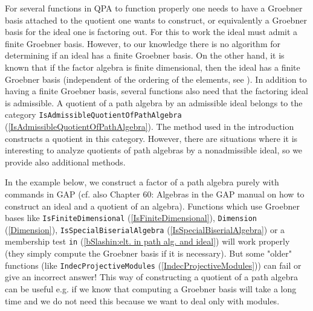 \documentclass[a4paper,11pt]{report}
\begin{document}
{{ For several functions in \textsf{QPA} to function properly one needs to have a Groebner basis attached to the
quotient one wants to construct, or equivalently a Groebner basis for the
ideal one is factoring out. For this to work the ideal must admit a finite
Groebner basis. However, to our knowledge there is no algorithm for
determining if an ideal has a finite Groebner basis. On the other hand, it is
known that if the factor algebra is finite dimensional, then the ideal has a
finite Groebner basis (independent of the ordering of the elements, see \cite{Green} ). In addition to having a finite Groebner basis, several functions also need
that the factoring ideal is admissible. A quotient of a path algebra by an
admissible ideal belongs to the category \texttt{IsAdmissibleQuotientOfPathAlgebra} (\ref{IsAdmissibleQuotientOfPathAlgebra}). The method used in the introduction constructs a quotient in this category.
However, there are situations where it is interesting to analyze quotients of
path algebras by a non\texttt{}admissible ideal, so we provide also
additional methods.

 In the example below, we construct a factor of a path algebra purely with
commands in \textsf{GAP} (cf. also Chapter 60: Algebras in the \textsf{GAP} manual on how to construct an ideal and a quotient of an algebra). Functions
which use Groebner bases like \texttt{IsFiniteDimensional} (\ref{IsFiniteDimensional}), \texttt{Dimension} (\ref{Dimension}), \texttt{IsSpecialBiserialAlgebra} (\ref{IsSpecialBiserialAlgebra}) or a membership test \texttt{\texttt{}in} (\ref{bSlashin:elt. in path alg. and ideal}) will work properly (they simply compute the Groebner basis if it is
necessary). But some "older" functions (like \texttt{IndecProjectiveModules} (\ref{IndecProjectiveModules})) can fail or give an incorrect answer! This way of constructing a quotient of
a path algebra can be useful e.g. if we know that computing a Groebner basis
will take a long time and we do not need this because we want to deal only
with modules.

}}
\end{document}
